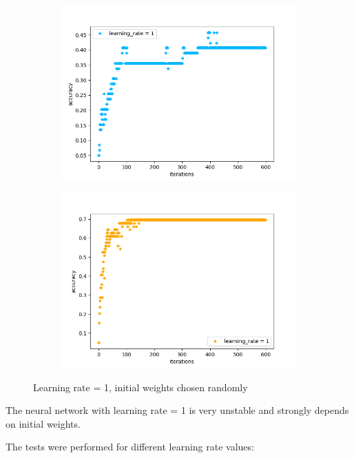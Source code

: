\begin{figure}[H]
\begin{subfigure}[b]{.45\linewidth}
\includegraphics[width=\linewidth]{img/tests/20ppl/learnig_rate1_v2.png}
\end{subfigure}
\begin{subfigure}[b]{.45\linewidth}
\includegraphics[width=\linewidth]{img/tests/20ppl/learnig_rate1_v3.png}
\end{subfigure}
\caption{Learning rate = 1, initial weights chosen randomly}
\label{fig:animals}
\end{figure}

The neural network with learning rate = 1 is very unstable and strongly depends on initial weights. 

The tests were performed for different learning rate values:

